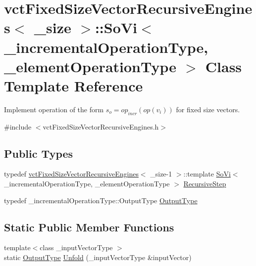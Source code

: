 \hypertarget{classvct_fixed_size_vector_recursive_engines_1_1_so_vi}{}\section{vct\+Fixed\+Size\+Vector\+Recursive\+Engines$<$ \+\_\+size $>$\+:\+:So\+Vi$<$ \+\_\+incremental\+Operation\+Type, \+\_\+element\+Operation\+Type $>$ Class Template Reference}
\label{classvct_fixed_size_vector_recursive_engines_1_1_so_vi}


Implement operation of the form $s_o = op_{incr}(op(v_i))$ for fixed size vectors.  




{\ttfamily \#include $<$vct\+Fixed\+Size\+Vector\+Recursive\+Engines.\+h$>$}

\subsection*{Public Types}
\begin{DoxyCompactItemize}
\item 
typedef \hyperlink{classvct_fixed_size_vector_recursive_engines}{vct\+Fixed\+Size\+Vector\+Recursive\+Engines}$<$ \+\_\+size-\/1 $>$\+::template \hyperlink{classvct_fixed_size_vector_recursive_engines_1_1_so_vi}{So\+Vi}$<$ \+\_\+incremental\+Operation\+Type, \+\_\+element\+Operation\+Type $>$ \hyperlink{classvct_fixed_size_vector_recursive_engines_1_1_so_vi_aad1f6b97a64a704bf2d21d95fb834c9b}{Recursive\+Step}
\item 
typedef \+\_\+incremental\+Operation\+Type\+::\+Output\+Type \hyperlink{classvct_fixed_size_vector_recursive_engines_1_1_so_vi_ae988d4e7479fa6cd314b1103f6a9aeab}{Output\+Type}
\end{DoxyCompactItemize}
\subsection*{Static Public Member Functions}
\begin{DoxyCompactItemize}
\item 
{\footnotesize template$<$class \+\_\+input\+Vector\+Type $>$ }\\static \hyperlink{classvct_fixed_size_vector_recursive_engines_1_1_so_vi_ae988d4e7479fa6cd314b1103f6a9aeab}{Output\+Type} \hyperlink{classvct_fixed_size_vector_recursive_engines_1_1_so_vi_a6dad9d6ad0d8265170c4a6e0eb5f7982}{Unfold} (\+\_\+input\+Vector\+Type \&input\+Vector)
\end{DoxyCompactItemize}


